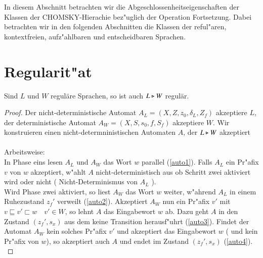 In diesem Abschnitt betrachten wir die Abgeschlossenheitseigenschaften der Klassen der CHOMSKY-Hierachie bez"uglich der Operation Fortsetzung. 
Dabei betrachten wir in den folgenden Abschnitten die Klassen der reful"aren, kontextfreien, aufz"ahlbaren und entscheidbaren Sprachen.

\section{Regularit"at}
\begin{satz}
Sind $L$ und $W$ regul\"are Sprachen, so ist auch $L\triangleright W$ regul\"ar.
\end{satz}
\begin{proof}
Der nicht-deterministische Automat $A_L= (X,Z,z_{0},\delta_L,Z_f)$ akzeptiere $L$, der deterministische Automat $A_W = (X,S,s_{0},f,S_{f})$ akzeptiere $W$.
Wir konstruieren einen nicht-determninistischen Automaten $A$, der $L\triangleright W$ akzeptiert \\\\Arbeitsweise:\\
In Phase eins lesen $A_L$ und $A_W$ das Wort $w$ parallel (\ref{auto1}). Falls $A_L$ ein Pr"afix $v$ von $w$ akzeptiert, w"ahlt $A$ nicht-deterministisch aus ob Schritt zwei aktiviert wird oder nicht ( Nicht-Determinismus von $A_L$ ).\\
Wird Phase zwei aktiviert, so liest $A_W$ das Wort $w$ weiter, w"ahrend $A_L$ in einem Ruhezustand $z_f'$ verweilt (\ref{auto2}). Akzeptiert $A_W$ nun ein Pr"afix $v'$ mit $v\sqsubseteq v'\sqsubset w\quad v'\in W$, so lehnt $A$ das Eingabewort $w$ ab. Dazu geht $A$ in den Zustand $(z_f',s_x)$ aus dem keine Transition herausf"uhrt (\ref{auto3}). Findet der Automat $A_W$ kein solches Pr"afix $v'$ und akzeptiert das Eingabewort $w$ ( und kein Pr"afix von $w$), so akzeptiert auch $A$ und endet im Zustand $(z_f',s_x)$ (\ref{auto4}).\\


\end{proof}
